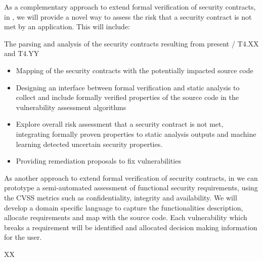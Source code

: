 \begin{Workpackage}{\thewpno}
\begin{Task}
\TaskResults{%
}
\TaskHeader{}

As a complementary approach to extend formal verification of security contracts, in \theTask, we will provide a novel way to assess the risk that a security contract is not met by an application. This will include:
\item The parsing and analysis of the security contracts resulting from present \theWP / T4.XX and T4.YY
\begin{itemize}
    \item Mapping of the security contracts with the potentially impacted source code
    \item Designing an interface between formal verification and static analysis to collect and include formally verified properties of the source code in the vulnerability assessment algorithms
    \item Explore overall risk assessment that a security contract is not met, integrating formally proven properties to static analysis outputs and machine learning detected uncertain security properties.
    \item Providing remediation proposals to fix vulnerabilities
\end{itemize}

\end{Task}


\begin{Task}

\TaskResults{%
}
\TaskHeader{}

As another approach to extend formal verification of security contracts, in \theTask we can prototype a semi-automated assessment of functional security requirements, using the CVSS metrics such as confidentiality, integrity and availability.
We will develop a domain specific language to capture the functionalities description, allocate requirements and map with the source code. Each vulnerability which breaks a requirement will be identified and allocated decision making information for the user.
\end{Task}


\begin{WPDeliverables}
  \begin{compactitem}
    \item XX
\end{compactitem}
\end{WPDeliverables}
\end{Workpackage}
